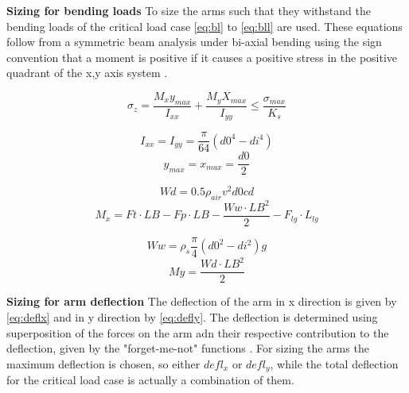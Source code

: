 \textbf{Sizing for bending loads} \newline
To size the arms such that they withstand the bending loads of the critical load case \autoref{eq:bl} to \autoref{eq:bll} are used. These equations follow from a symmetric beam analysis under bi-axial bending using the sign convention that a moment is positive if it causes a positive stress in the positive quadrant of the x,y axis system \cite{SAD}.


\begin{equation} \label{eq:bl}
    \sigma_z = \frac{M_x y_{max}}{I_{xx}} + \frac{M_y X_{max}}{I_{yy}} \leq \frac{\sigma_{max}}{K_s}
\end{equation}
\begin{multicols}{2}\setlength{\columnseprule}{0pt}
\begin{equation}
     I_{xx} = I_{yy} =\frac{\pi}{64} \left(d0^4 - di^4\right)
\end{equation}
\break
\begin{equation}
     y_{max} = x_{max} = \frac{d0}{2}
\end{equation}
\end{multicols}


\begin{multicols}{2}\setlength{\columnseprule}{0pt}
\begin{equation}
   Wd = 0.5 \rho_{air}  v^2 d0  cd
\end{equation}
\break
\begin{equation}
   M_x = Ft \cdot LB - Fp \cdot LB - \frac{Ww \cdot LB^2}{2} -F_{lg}\cdot L_{lg}
\end{equation}
\end{multicols}

\begin{multicols}{2}\setlength{\columnseprule}{0pt}
\begin{equation}
     Ww = \rho_s  \frac{\pi}{4}  (d0^2 - di^2)  g
\end{equation}
\break
\begin{equation} \label{eq:bll}
      My = \frac{Wd\cdot LB^2}{2}
\end{equation}
\end{multicols}

\textbf{Sizing for arm deflection} \newline
The deflection of the arm in x direction is given by \autoref{eq:deflx} and in y direction by \autoref{eq:defly}. The deflection is determined using superposition of the forces on the arm adn their respective contribution to the deflection, given by the "forget-me-not" functions \cite{MoM}. For sizing the arms the maximum deflection is chosen, so either $defl_x$ or $defl_y$, while the total deflection for the critical load case is actually a combination of them.

